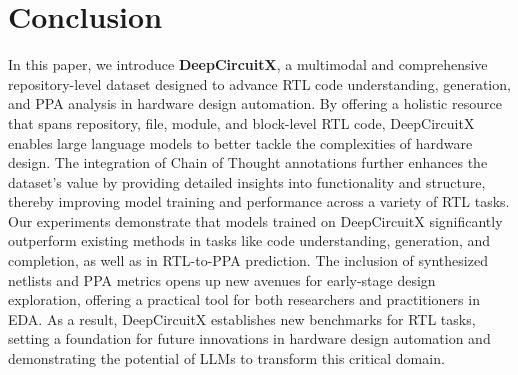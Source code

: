 \section{Conclusion}\label{Sec:Conclusion}

In this paper, we introduce \textbf{DeepCircuitX}, a multimodal and comprehensive repository-level dataset designed to advance RTL code understanding, generation, and PPA analysis in hardware design automation. By offering a holistic resource that spans repository, file, module, and block-level RTL code, DeepCircuitX enables large language models to better tackle the complexities of hardware design. The integration of Chain of Thought annotations further enhances the dataset's value by providing detailed insights into functionality and structure, thereby improving model training and performance across a variety of RTL tasks.
Our experiments demonstrate that models trained on DeepCircuitX significantly outperform existing methods in tasks like code understanding, generation, and completion, as well as in RTL-to-PPA prediction. The inclusion of synthesized netlists and PPA metrics opens up new avenues for early-stage design exploration, offering a practical tool for both researchers and practitioners in EDA. As a result, DeepCircuitX establishes new benchmarks for RTL tasks, setting a foundation for future innovations in hardware design automation and demonstrating the potential of LLMs to transform this critical domain.